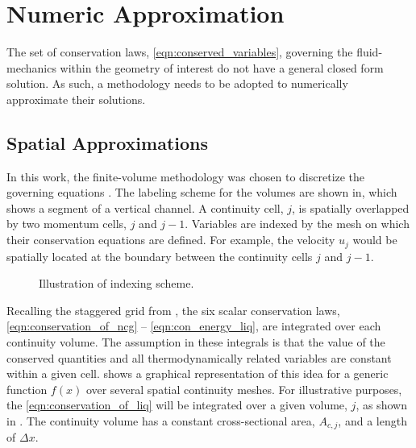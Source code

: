 \section{Numeric Approximation}
\label{sect:numeric_approximation}
The set of conservation laws, \eqref{eqn:conserved_variables}, governing the fluid-mechanics within the geometry of interest do not have a general closed form solution.
As such, a methodology needs to be adopted to numerically approximate their solutions.

\subsection{Spatial Approximations}
\label{subsect:spatial_approx}
In this work, the finite-volume methodology was chosen to discretize the governing equations \cite{LeVeque2002}.
The labeling scheme for the volumes are shown in, which shows a segment of a vertical channel.
A continuity cell, $j$, is spatially overlapped by two momentum cells, $j$ and $j-1$.
Variables are indexed by the mesh on which their conservation equations are defined.
For example, the velocity $u_j$ would be spatially located at the boundary between the continuity cells $j$ and $j-1$.

\begin{figure}[ht]
\caption{Illustration of indexing scheme.}
\label{fig:vertical_pipe_with_cells}
\begin{center}
\end{center}
\end{figure}

Recalling the staggered grid from , the six scalar conservation laws, \eqref{eqn:conservation_of_ncg} -- \eqref{eqn:con_energy_liq}, are integrated over each continuity volume.
The assumption in these integrals is that the value of the conserved quantities and all thermodynamically related variables are constant within a given cell.
 shows a graphical representation of this idea for a generic function $f(x)$ over several spatial continuity meshes.
For illustrative purposes,  the \eqref{eqn:conservation_of_liq} will be integrated over a given volume, $j$, as shown in .
The continuity volume has a constant cross-sectional area, $A_{c,j}$, and a length of $\Delta x$.

